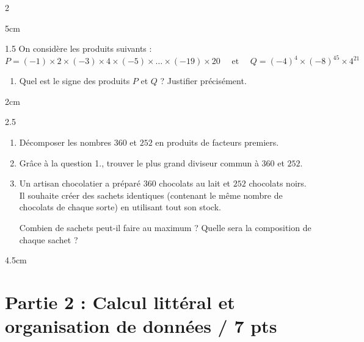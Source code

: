 \documentclass[a4paper]{book}
\begin{document}
{\begin{exerciceNote}{2}
        \begin{ZoneReponse}{5cm}
        \end{ZoneReponse}
    \end{exerciceNote}

    
    \begin{exerciceNote}{1.5}
        On considère les produits suivants : 
        $$P = (-1) \times 2 \times (-3) \times 4 \times (-5) \times \dots \times (-19) \times 20 
        \quad \text{  et  } \quad Q=(-4)^4\times(-8)^{45}\times4^{21}$$
        \begin{enumerate}
            \item Quel est le signe des produits $P$ et $Q$ ? Justifier précisément.
        \end{enumerate}
        
        \begin{ZoneReponse}{2cm}
        \end{ZoneReponse}
    \end{exerciceNote}


\newpage
    
    \begin{exerciceNote}{2.5}
        \begin{enumerate}
            \item Décomposer les nombres $360$ et $252$ en produits de facteurs premiers.
            \item Grâce à la question 1., trouver le plus grand diviseur commun à $360$ et $252$.
            \item Un artisan chocolatier a préparé $360$ chocolats au lait et $252$ chocolats noirs. Il souhaite créer des sachets identiques (contenant le même nombre de chocolats de chaque sorte) en utilisant tout son stock. 
            
            Combien de sachets peut-il faire au maximum ? Quelle sera la composition de chaque sachet ?
        \end{enumerate}
        
        \begin{ZoneReponse}{4.5cm}
        \end{ZoneReponse}
    \end{exerciceNote}
    
\bigskip
    
\section*{Partie 2 : Calcul littéral et organisation de données \points[2]/ 7 pts }

}
\end{document}
